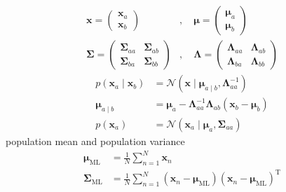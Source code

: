 \documentclass{article}
\begin{document}
	$$
	\begin{aligned}
	\mathbf{x}=\left(\begin{array}{c}
	\mathbf{x}_{a} \\
	\mathbf{x}_{b}
	\end{array}\right)&, \quad \boldsymbol{\mu}=\left(\begin{array}{c}
	\boldsymbol{\mu}_{a} \\
	\boldsymbol{\mu}_{b}
	\end{array}\right)\\
	\boldsymbol{\Sigma}=\left(\begin{array}{ll}
	\boldsymbol{\Sigma}_{a a} & \boldsymbol{\Sigma}_{a b} \\
	\boldsymbol{\Sigma}_{b a} & \boldsymbol{\Sigma}_{b b}
	\end{array}\right)&, \quad \boldsymbol{\Lambda}=\left(\begin{array}{ll}
	\boldsymbol{\Lambda}_{a a} & \boldsymbol{\Lambda}_{a b} \\
	\boldsymbol{\Lambda}_{b a} & \boldsymbol{\Lambda}_{b b}
	\end{array}\right)
	\end{aligned}
	$$
	$$
	\begin{aligned}
	p\left(\mathbf{x}_{a} \mid \mathbf{x}_{b}\right) &=\mathcal{N}\left(\mathbf{x} \mid \boldsymbol{\mu}_{a \mid b}, \boldsymbol{\Lambda}_{a a}^{-1}\right) \\
	\boldsymbol{\mu}_{a \mid b} &=\boldsymbol{\mu}_{a}-\boldsymbol{\Lambda}_{a a}^{-1} \boldsymbol{\Lambda}_{a b}\left(\mathbf{x}_{b}-\boldsymbol{\mu}_{b}\right)\\
	p\left(\mathbf{x}_{a}\right)&=\mathcal{N}\left(\mathbf{x}_{a} \mid \boldsymbol{\mu}_{a}, \boldsymbol{\Sigma}_{a a}\right)
	\end{aligned}
	$$
	population mean and population variance 
	 $$
	 \begin{aligned}
	 \boldsymbol{\mu}_{\mathrm{ML}}&=\frac{1}{N} \sum_{n=1}^{N} \mathbf{x}_{n}\\
	 \boldsymbol{\Sigma}_{\mathrm{ML}}&=\frac{1}{N} \sum_{n=1}^{N}\left(\mathbf{x}_{n}-\boldsymbol{\mu}_{\mathrm{ML}}\right)\left(\mathbf{x}_{n}-\boldsymbol{\mu}_{\mathrm{ML}}\right)^{\mathrm{T}}
	 \end{aligned}
	 $$
	 
\end{document}
